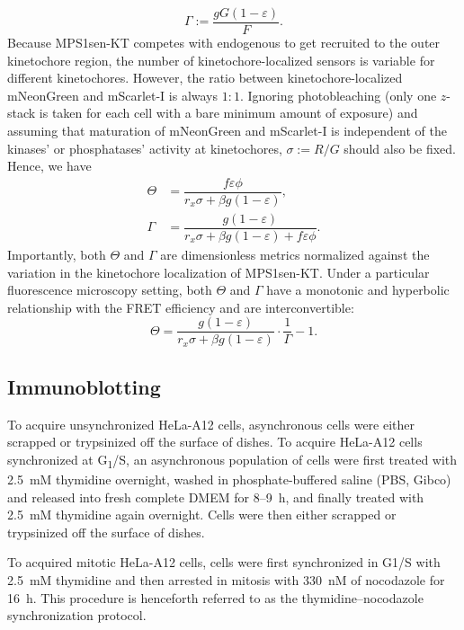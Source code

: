 \begin{equation*}
    \Gamma := \dfrac{gG(1 - \varepsilon)}{F}.
\end{equation*}
Because MPS1sen-KT competes with endogenous  to get recruited to the outer kinetochore region, the number of kinetochore-localized sensors is variable for different kinetochores. However, the ratio between kinetochore-localized mNeonGreen and mScarlet-I is always $1 : 1$. Ignoring photobleaching (only one $z$-stack is taken for each cell with a bare minimum amount of exposure) and assuming that maturation of mNeonGreen and mScarlet-I is independent of the kinases' or phosphatases' activity at kinetochores, $\sigma := R/G$ should also be fixed. Hence, we have
\begin{align*}
    \Theta &= \dfrac{f\varepsilon\phi}{r_x\sigma + \beta g(1 - \varepsilon)},\\
    \Gamma &= \dfrac{g(1 - \varepsilon)}{r_x\sigma + \beta g(1 - \varepsilon) + f\varepsilon\phi}.
\end{align*}
Importantly, both $\Theta$ and $\Gamma$ are dimensionless metrics normalized against the variation in the kinetochore localization of MPS1sen-KT. Under a particular fluorescence microscopy setting, both $\Theta$ and $\Gamma$ have a monotonic and hyperbolic relationship with the FRET efficiency and are interconvertible:
\begin{equation*}
    \Theta = \dfrac{g(1 - \varepsilon)}{r_x\sigma + \beta g(1 - \varepsilon)}\cdot\dfrac{1}{\Gamma} - 1.
\end{equation*}

\subsection{Immunoblotting}
\label{WBMethods}
To acquire unsynchronized HeLa-A12 cells, asynchronous cells were either scrapped or trypsinized off the surface of dishes. To acquire HeLa-A12 cells synchronized at G\textsubscript{1}/S, an asynchronous population of cells were first treated with \SI{2.5}{mM} thymidine overnight, washed in phosphate-buffered saline (PBS, Gibco) and released into fresh complete DMEM for 8--\SI{9}{h}, and finally treated with \SI{2.5}{mM} thymidine again overnight. Cells were then either scrapped or trypsinized off the surface of dishes.

To acquired mitotic HeLa-A12 cells, cells were first synchronized in G1/S with \SI{2.5}{mM} thymidine and then arrested in mitosis with \SI{330}{nM} of nocodazole for \SI{16}{h}. This procedure is henceforth referred to as the thymidine--nocodazole synchronization protocol.

